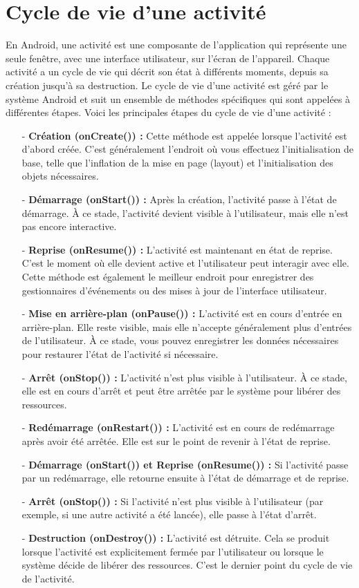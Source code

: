 \section{Cycle de vie d'une activité}
En Android, une activité est une composante de l'application qui représente une seule fenêtre, avec une interface utilisateur, sur l'écran de l'appareil. Chaque activité a un cycle de vie qui décrit son état à différents moments, depuis sa création jusqu'à sa destruction. Le cycle de vie d'une activité est géré par le système Android et suit un ensemble de méthodes spécifiques qui sont appelées à différentes étapes. Voici les principales étapes du cycle de vie d'une activité :
  \begin{itemize}  
    \item[-] \textbf{Création (onCreate()) : } Cette méthode est appelée lorsque l'activité est d'abord créée. C'est généralement l'endroit où vous effectuez l'initialisation de base, telle que l'inflation de la mise en page (layout) et l'initialisation des objets nécessaires.
    \item[-] \textbf{Démarrage (onStart()) :} Après la création, l'activité passe à l'état de démarrage. À ce stade, l'activité devient visible à l'utilisateur, mais elle n'est pas encore interactive.
    \item[-] \textbf{Reprise (onResume()) :}  L'activité est maintenant en état de reprise. C'est le moment où elle devient active et l'utilisateur peut interagir avec elle. Cette méthode est également le meilleur endroit pour enregistrer des gestionnaires d'événements ou des mises à jour de l'interface utilisateur.
    \item[-] \textbf{Mise en arrière-plan (onPause()) :}  L'activité est en cours d'entrée en arrière-plan. Elle reste visible, mais elle n'accepte généralement plus d'entrées de l'utilisateur. À ce stade, vous pouvez enregistrer les données nécessaires pour restaurer l'état de l'activité si nécessaire.
    \item[-] \textbf{ Arrêt (onStop()) :} L'activité n'est plus visible à l'utilisateur. À ce stade, elle est en cours d'arrêt et peut être arrêtée par le système pour libérer des ressources.
    \item[-] \textbf{Redémarrage (onRestart()) :}  L'activité est en cours de redémarrage après avoir été arrêtée. Elle est sur le point de revenir à l'état de reprise.
    \item[-] \textbf{ Démarrage (onStart()) et Reprise (onResume()) :} Si l'activité passe par un redémarrage, elle retourne ensuite à l'état de démarrage et de reprise.
    \item[-] \textbf{Arrêt (onStop()) :}  Si l'activité n'est plus visible à l'utilisateur (par exemple, si une autre activité a été lancée), elle passe à l'état d'arrêt.
    \item[-] \textbf{Destruction (onDestroy()) : } L'activité est détruite. Cela se produit lorsque l'activité est explicitement fermée par l'utilisateur ou lorsque le système décide de libérer des ressources. C'est le dernier point du cycle de vie de l'activité.

\end{itemize}
